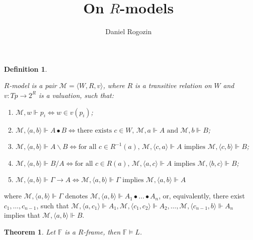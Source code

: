 \documentclass[a4paper]{article}
\date{}
\author[1,2]{Daniel Rogozin}
\affil[1]{Lomonosov Moscow State University}
\affil[2]{Serokell O\"{U}}
\title{On $R$-models}
\theoremstyle{defin}
\newtheorem{defin}{Definition}
\theoremstyle{theorem}
\newtheorem{theorem}{Theorem}
\theoremstyle{prop}
\theoremstyle{lemma}
\theoremstyle{ex}
\theoremstyle{col}
\begin{document}
\maketitle

\begin{defin}
  $ $

  $R$-model is a pair $\mathcal{M} = \langle W, R, v \rangle$,
  where $R$ is a transitive relation on $W$ and $v : Tp \to 2^R$ is a valuation, such that:

  \begin{enumerate}
    \item $\mathcal{M}, w \Vdash p_i \Leftrightarrow w \in v(p_i)$;
    \item $\mathcal{M}, \langle a, b \rangle \Vdash A \bullet B \Leftrightarrow
      \text{there exists $c \in W$, $\mathcal{M}, a \Vdash A$ and $\mathcal{M}, b \Vdash B$}$;
    \item $\mathcal{M}, \langle a, b \rangle \Vdash A \backslash B \Leftrightarrow
      \text{for all $c \in R^{-1}(a)$, $\mathcal{M}, \langle c, a \rangle \Vdash A$ implies
      $\mathcal{M}, \langle c, b \rangle \Vdash B$}$;
    \item $\mathcal{M}, \langle a, b \rangle \Vdash B / A \Leftrightarrow
        \text{for all $c \in R(a)$, $\mathcal{M}, \langle a, c \rangle \Vdash A$ implies
        $\mathcal{M}, \langle b, c \rangle \Vdash B$}$;
    \item $\mathcal{M}, \langle a, b \rangle \Vdash \Gamma \rightarrow A \Leftrightarrow
    \mathcal{M}, \langle a, b \rangle \Vdash \Gamma \text{ implies } \mathcal{M}, \langle a, b \rangle \Vdash A$
  \end{enumerate}
\end{defin}

where $\mathcal{M}, \langle a, b \rangle \Vdash \Gamma$ denotes $\mathcal{M}, \langle a, b \rangle \Vdash A_1 \bullet \dots \bullet A_n$, or,
equivalently, there exist $c_1, \dots, c_{n-1}$,
such that $\mathcal{M}, \langle a, c_1 \rangle \Vdash A_1,
\mathcal{M}, \langle c_1, c_2 \rangle \Vdash A_2, \dots,
\mathcal{M}, \langle c_{n-1}, b \rangle \Vdash A_n$ implies that $\mathcal{M}, \langle a, b \rangle \Vdash B$.

\begin{theorem}
  Let $\mathbb{F}$ is a $R$-frame, then $\mathbb{F} \models L$.
\end{theorem}
\end{document}
